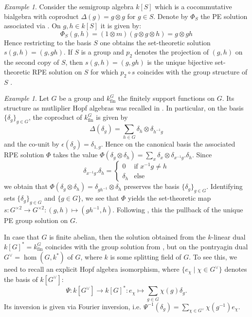 \documentclass[a4paper,10pt]{amsart}
\theoremstyle{definition}
\theoremstyle{remark}
\newtheorem{example}[lemma]{Example}
\newcommand{\fin}{\operatorname{fin}}
\newcommand\D{\Delta}
\newcommand\ot{\otimes}
\begin{document}
\begin{example}\label{sol from grp alg}
Consider the semigroup algebra $k[S]$ which is a cocommutative bialgebra with coproduct $\D(g) = g \ot g$ for $g \in S$. Denote by $\Phi_S$ the PE solution associated via . On $g,h \in k[S]$ it is given by:
$$\Phi_{S} (g,h) = (1 \ot m) (g \ot g \ot h)= g \ot gh$$
Hence restricting to the basis $S$ one obtains the set-theoretic solution $s(g,h) = (g,gh)$. If $S$ is a group and $p_2$ denotes the projection of $(g,h)$ on the second copy of $S$, then $s(g,h) = (g,gh)$ is the unique bijective set-theoretic RPE solution on $S$ for which $p_{2} \circ s$ coincides with the group structure of $S$  \cite{MR1637789,CMM19}.  
\end{example}

\begin{example}\label{sol from dual grp alg}
Let $G$ be a group and $k^G_{\fin}$ the finitely support functions on $G$. Its structure as mutliplier Hopf algebras was recalled in . In particular, on the basis  $\{ \delta_g \}_{g \in G}$, the coproduct of $k^G_{\fin}$ is given by
$$\D(\delta_g) = \sum_{h \in G} \delta_h \ot \delta_{h^{-1}g}$$
and the co-unit by $\epsilon(\delta_g) = \delta_{1,g}.$
Hence on the canonical basis the associated RPE solution $\Phi$ takes the value $ \Phi(\delta_g \ot \delta_h)  =  \sum_{x} \delta_x \ot \delta_{x^{-1}g}.\delta_h$. Since
 $$
\delta_{x^{-1}g}.\delta_h = \left\lbrace \begin{array}{ll}
            0  & \text{if } x^{-1}g \neq h \\
            \delta_h  & \text{else }
         \end{array} \right.
$$
we obtain that $\Phi(\delta_g \ot \delta_h) = \delta_{gh^{-1}} \ot \delta_h$ preserves the basis $\{ \delta_g \}_{g\in G}$. Identifying sets $\{ \delta_g \}_{g\in G}$ and $\{ g \in G \}$, we see that $\Phi$ yields the set-theoretic map $s : G^{\times 2} \rightarrow G^{\times 2}: (g,h) \mapsto (gh^{-1},h).$ Following , this the pullback of the unique PE group solution on $G$. \smallskip

In case that $G$ is finite abelian, then the solution obtained from the $k$-linear dual $k[G]^*= k^G_{\fin}$ coincides with the group solution from , but on the pontryagin dual $G^{\vee}= \hom(G,k^*)$ of $G$, where $k$ is some splitting field of $G$. To see this, we need to recall an explicit Hopf algebra isomorphism, where $\{ e_{\chi} \mid \chi \in G^{\vee} \}$ denotes the basis of $k[G^{\vee}] $: 
\begin{equation}\label{map between two types of dual}
\Psi: k[G^{\vee}] \rightarrow k[G]^*: e_{\chi} \mapsto \sum_{g\in G} \chi(g) \delta_g.
\end{equation}
Its inversion is given via Fourier inversion, i.e. $\Psi^{-1}(\delta_g) = \sum_{\chi \in G^{\vee}}\chi(g^{-1})e_{\chi}.$\smallskip


\end{example}
\end{document}
